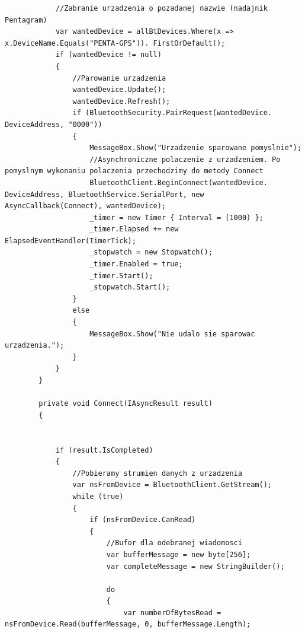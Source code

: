 \documentclass[12pt,a4paper,notitlepage]{report}
\begin{document}
\begin{adjustwidth}{0pt}{-50pt}
\begin{lstlisting}
            //Zabranie urzadzenia o pozadanej nazwie (nadajnik Pentagram)
            var wantedDevice = allBtDevices.Where(x => x.DeviceName.Equals("PENTA-GPS")). FirstOrDefault();
            if (wantedDevice != null)
            {
                //Parowanie urzadzenia
                wantedDevice.Update();
                wantedDevice.Refresh();
                if (BluetoothSecurity.PairRequest(wantedDevice. DeviceAddress, "0000"))
                {
                    MessageBox.Show("Urzadzenie sparowane pomyslnie");
                    //Asynchroniczne polaczenie z urzadzeniem. Po pomyslnym wykonaniu polaczenia przechodzimy do metody Connect
                    BluetoothClient.BeginConnect(wantedDevice. DeviceAddress, BluetoothService.SerialPort, new AsyncCallback(Connect), wantedDevice);
                    _timer = new Timer { Interval = (1000) };
                    _timer.Elapsed += new ElapsedEventHandler(TimerTick);
                    _stopwatch = new Stopwatch();
                    _timer.Enabled = true;
                    _timer.Start();
                    _stopwatch.Start();
                }
                else
                {
                    MessageBox.Show("Nie udalo sie sparowac urzadzenia.");
                }
            }
        }

        private void Connect(IAsyncResult result)
        {
            

            if (result.IsCompleted)
            {
                //Pobieramy strumien danych z urzadzenia
                var nsFromDevice = BluetoothClient.GetStream();
                while (true)
                {
                    if (nsFromDevice.CanRead)
                    {
                        //Bufor dla odebranej wiadomosci
                        var bufferMessage = new byte[256];
                        var completeMessage = new StringBuilder();
                        
                        do
                        {
                            var numberOfBytesRead = nsFromDevice.Read(bufferMessage, 0, bufferMessage.Length);


\end{lstlisting}
\end{adjustwidth}
\end{document}
